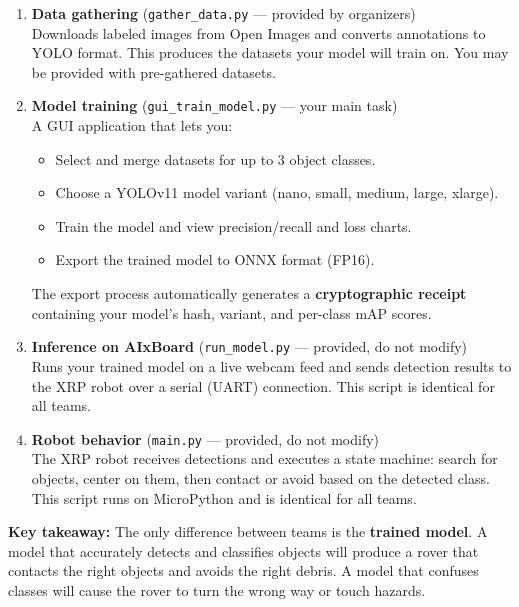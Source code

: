 \documentclass[a4]{article}
\begin{document}
\begin{enumerate}
    \item \textbf{Data gathering} (\texttt{gather\_data.py} --- provided by organizers) \\
    Downloads labeled images from Open Images and converts annotations to YOLO format. This produces the datasets your model will train on. You may be provided with pre-gathered datasets.

    \item \textbf{Model training} (\texttt{gui\_train\_model.py} --- your main task) \\
    A GUI application that lets you:
    \begin{itemize}
        \item Select and merge datasets for up to 3 object classes.
        \item Choose a YOLOv11 model variant (nano, small, medium, large, xlarge).
        \item Train the model and view precision/recall and loss charts.
        \item Export the trained model to ONNX format (FP16).
    \end{itemize}
    The export process automatically generates a \textbf{cryptographic receipt} containing your model's hash, variant, and per-class mAP scores.

    \item \textbf{Inference on AIxBoard} (\texttt{run\_model.py} --- provided, do not modify) \\
    Runs your trained model on a live webcam feed and sends detection results to the XRP robot over a serial (UART) connection. This script is identical for all teams.

    \item \textbf{Robot behavior} (\texttt{main.py} --- provided, do not modify) \\
    The XRP robot receives detections and executes a state machine: search for objects, center on them, then contact or avoid based on the detected class. This script runs on MicroPython and is identical for all teams.
\end{enumerate}

\begin{framed}
\textbf{Key takeaway:} The only difference between teams is the \textbf{trained model}. A model that accurately detects and classifies objects will produce a rover that contacts the right objects and avoids the right debris. A model that confuses classes will cause the rover to turn the wrong way or touch hazards.
\end{framed}
\end{document}
